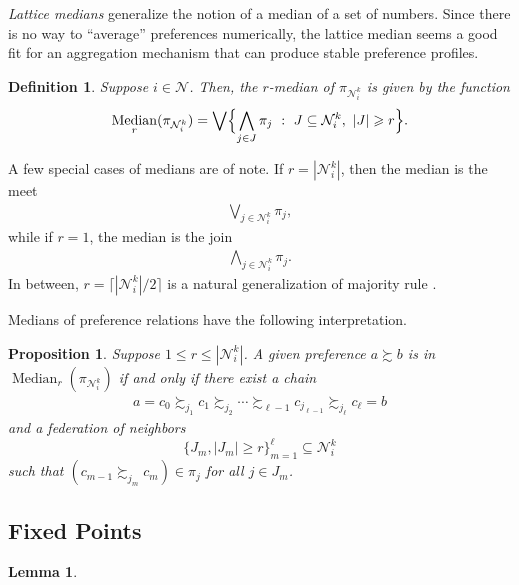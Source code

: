 \documentclass[conference]{ieeeconf}
\newcommand{\N}{\mathcal{N}}
\newcommand{\prefers}{\succsim}
\newcommand{\bigjoin}{\bigvee}
\newcommand{\bigmeet}{\bigwedge}
\renewcommand{\leq}{\leqslant}
\renewcommand{\geq}{\geqslant}
\DeclareMathOperator{\Median}{Median}
\newtheorem{lemma}{Lemma}
\newtheorem{proposition}{Proposition}
\newtheorem{definition}{Definition}
\newtheorem{axiom}{Axiom}
\begin{document}
\emph{Lattice medians} generalize the notion of a median of a set of numbers. Since there is no way to ``average'' preferences numerically, the lattice median seems a good fit for an aggregation mechanism that can produce stable preference profiles.
\begin{definition}
    Suppose $i \in \N$. Then, the $r$-median of  $\pi_{\N_i^k}$ is given by the function
\begin{align}
    \Median_r(\pi_{\N_i^k}) = \bigjoin \Bigl\{ \bigmeet_{j \in J} \pi_j~:~J \subseteq \N_i^k,~|J| \geq r \Bigr\}.
\end{align}
\end{definition}

A few special cases of medians are of note. If $r= |\N_i^k|$, then the median is the meet
\begin{align*}
   \bigjoin_{j \in \N_i^k} \pi_j,
\end{align*}
while if $r=1$, the median is the join
\begin{align*}
     \bigmeet_{j \in \N_i^k} \pi_j.
\end{align*}
In between, $r = \lceil |\N_i^k|/2 \rceil$ is a natural generalization of majority rule \cite{leclerc}.

Medians of preference relations have the following interpretation.
\begin{proposition}
    Suppose $1 \leq r \leq |\N_i^k|$. A given preference $a \prefers b$ is in $\Median_r(\pi_{\N_i^k})$ if and only if there exist a chain
    \begin{align*}
        a = c_0 \prefers_{j_1} c_1 \prefers_{j_2} \cdots \prefers_{\ell-1} c_{j_{\ell-1}} \prefers_{j_\ell} c_{\ell} = b
    \end{align*}
    and a federation of neighbors \[\{ J_m, |J_m| \geq r \}_{m=1}^{\ell} \subseteq \N_i^k\] such that $(c_{m-1} \prefers_{j_m} c_{m}) \in \pi_j$ for all  $j \in J_m$.
\end{proposition}
 
\subsection{Fixed Points}

\begin{lemma}
\end{lemma}


\end{document}
